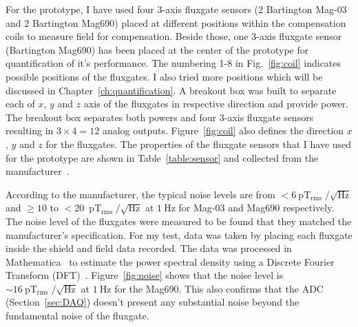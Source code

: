 For the prototype, I have used four 3-axis fluxgate sensors (2 Bartington Mag-03 and 2 Bartington Mag690) placed at different positions within the compensation coils to measure field for compensation. Beside those, one 3-axis fluxgate sensor (Bartington Mag690) has been placed at the center of the prototype for quantification of it's performance. The numbering 1-8 in Fig.~\ref{fig:coil} indicates possible positions of the fluxgates. I also tried more positions which will be discussed in Chapter~\ref{ch:quantification}. A breakout box was built to separate each of $x$, $y$ and $z$ axis of the fluxgates in respective direction and provide power. The breakout box separates both powers and four 3-axis fluxgate sensors resulting in $3\times4=12$ analog outputs. Figure~\ref{fig:coil} also defines the direction $x$, $y$ and $z$ for the fluxgates.  The properties of the fluxgate sensors that I have used for the prototype are shown in Table~\ref{table:sensor} and collected from the manufacturer~\cite{flux}. 





According to the manufacturer, the typical noise levels are from $\mathrm{<6~pT_{rms}\;/\sqrt{Hz}}$ and $\geq \mathrm{10}$ to $\mathrm{<20}$~$\mathrm{pT_{rms}\;/\sqrt{Hz}}$ at $\mathrm{1~Hz}$ for Mag-03 and Mag690 respectively. The noise level of the fluxgates were measured to be found that they matched the manufacturer's specification. For my test, data was taken by placing each fluxgate inside the shield and field data recorded. The data was processed in Mathematica~\cite{Mathematica} to estimate the power spectral density using a Discrete Fourier Transform (DFT)~\cite{dft}. Figure~\ref{fig:noise} shows that the noise level is $\sim\mathrm{16~pT_{rms}\;/\sqrt{Hz}}$ at $\mathrm{1~Hz}$ for the Mag690. This also confirms that the ADC (Section~\ref{sec:DAQ}) doesn't present any substantial noise beyond the fundamental noise of the fluxgate.






